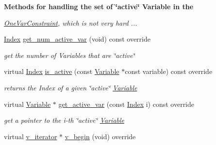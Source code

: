 \begin{Indent}\textbf{ Methods for handling the set of \char`\"{}active\char`\"{} Variable in the}\par
{\em \mbox{\hyperlink{class_s_m_spp__di__unipi__it_1_1_one_var_constraint}{One\+Var\+Constraint}}, which is not very hard ... }\begin{DoxyCompactItemize}
\item 
\mbox{\hyperlink{group___thin_var_dep_interface___c_l_a_s_s_e_s_gad53d6229d7ec28555a9c9c2fd9abf773}{Index}} \mbox{\hyperlink{class_s_m_spp__di__unipi__it_1_1_one_var_constraint_acc8ac3c57cc2c71ac3fe6c409fe53074}{get\+\_\+num\+\_\+active\+\_\+var}} (void) const override
\begin{DoxyCompactList}\small\item\em get the number of Variables that are \char`\"{}active\char`\"{} \end{DoxyCompactList}\item 
virtual \mbox{\hyperlink{group___thin_var_dep_interface___c_l_a_s_s_e_s_gad53d6229d7ec28555a9c9c2fd9abf773}{Index}} \mbox{\hyperlink{class_s_m_spp__di__unipi__it_1_1_one_var_constraint_a4dbea8d93b14035203b5edce6fd35cfb}{is\+\_\+active}} (const \mbox{\hyperlink{class_s_m_spp__di__unipi__it_1_1_variable}{Variable}} $\ast$const variable) const override
\begin{DoxyCompactList}\small\item\em returns the Index of a given \char`\"{}active\char`\"{} \mbox{\hyperlink{class_s_m_spp__di__unipi__it_1_1_variable}{Variable}} \end{DoxyCompactList}\item 
virtual \mbox{\hyperlink{class_s_m_spp__di__unipi__it_1_1_variable}{Variable}} $\ast$ \mbox{\hyperlink{class_s_m_spp__di__unipi__it_1_1_one_var_constraint_a8599e4f65a8e9750fa7020ff2f50161f}{get\+\_\+active\+\_\+var}} (const \mbox{\hyperlink{group___thin_var_dep_interface___c_l_a_s_s_e_s_gad53d6229d7ec28555a9c9c2fd9abf773}{Index}} i) const override
\begin{DoxyCompactList}\small\item\em get a pointer to the i-\/th \char`\"{}active\char`\"{} \mbox{\hyperlink{class_s_m_spp__di__unipi__it_1_1_variable}{Variable}} \end{DoxyCompactList}\item 
virtual \mbox{\hyperlink{class_s_m_spp__di__unipi__it_1_1_one_var_constraint_1_1v__iterator}{v\+\_\+iterator}} $\ast$ \mbox{\hyperlink{class_s_m_spp__di__unipi__it_1_1_one_var_constraint_ad0b5bcf42a678385fdba6fe41ce9626b}{v\+\_\+begin}} (void) override

\end{DoxyCompactItemize}
\end{Indent}

